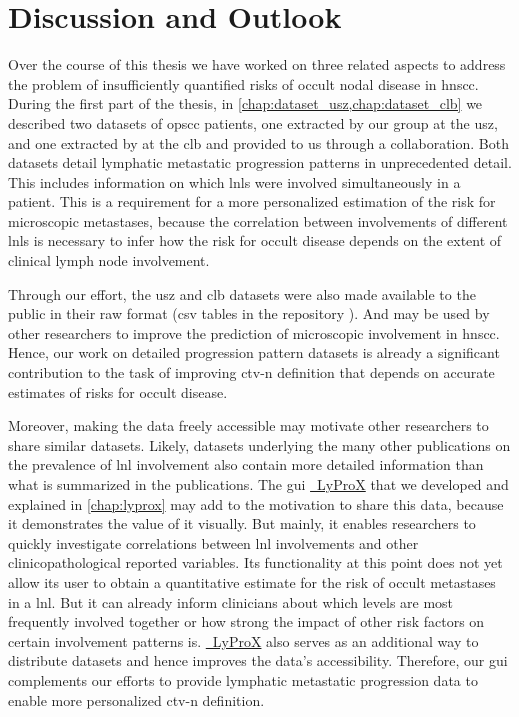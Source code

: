 \documentclass[\relativeRoot/main.tex]{subfiles}
\begin{document}
\chapter{Discussion and Outlook}
\label{chap:discussion}

Over the course of this thesis we have worked on three related aspects to address the problem of insufficiently quantified risks of occult nodal disease in \gls{hnscc}. During the first part of the thesis, in \cref{chap:dataset_usz,chap:dataset_clb} we described two datasets of \gls{opscc} patients, one extracted by our group at the \gls{usz}, and one extracted by  at the \gls{clb} and provided to us through a collaboration. Both datasets detail lymphatic metastatic progression patterns in unprecedented detail. This includes information on which \glspl{lnl} were involved simultaneously in a patient. This is a requirement for a more personalized estimation of the risk for microscopic metastases, because the correlation between involvements of different \glspl{lnl} is necessary to infer how the risk for occult disease depends on the extent of clinical lymph node involvement.

Through our effort, the \gls{usz} and \gls{clb} datasets were also made available to the public in their raw format (\acrshort{csv} tables in the repository ). And may be used by other researchers to improve the prediction of microscopic involvement in \gls{hnscc}. Hence, our work on detailed progression pattern datasets is already a significant contribution to the task of improving \gls{ctv-n} definition that depends on accurate estimates of risks for occult disease.

Moreover, making the data freely accessible may motivate other researchers to share similar datasets. Likely, datasets underlying the many other publications on the prevalence of \gls{lnl} involvement \cite{candela_patterns_1990,shah_patterns_1990,woolgar_histological_1999,woolgar_topography_2007,chao_determination_2002,vauterin_patterns_2006,razfar_incidence_2009,ho_patterns_2012,bauwens_prevalence_2021} also contain more detailed information than what is summarized in the publications. The \gls{gui} \href{https://lyprox.org}{~LyProX} that we developed and explained in \cref{chap:lyprox} may add to the motivation to share this data, because it demonstrates the value of it visually. But mainly, it enables researchers to quickly investigate correlations between \gls{lnl} involvements and other clinicopathological reported variables. Its functionality at this point does not yet allow its user to obtain a quantitative estimate for the risk of occult metastases in a \gls{lnl}. But it can already inform clinicians about which levels are most frequently involved together or how strong the impact of other risk factors on certain involvement patterns is. \href{https://lyprox.org}{~LyProX} also serves as an additional way to distribute datasets and hence improves the data's accessibility. Therefore, our \gls{gui} complements our efforts to provide lymphatic metastatic progression data to enable more personalized \gls{ctv-n} definition.
\end{document}
